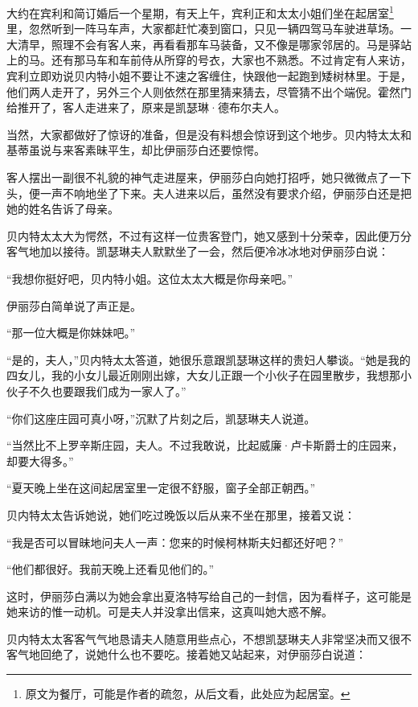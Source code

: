\par 大约在宾利和简订婚后一个星期，有天上午，宾利正和太太小姐们坐在起居室\footnote{原文为餐厅，可能是作者的疏忽，从后文看，此处应为起居室。}里，忽然听到一阵马车声，大家都赶忙凑到窗口，只见一辆四驾马车驶进草场。一大清早，照理不会有客人来，再看看那车马装备，又不像是哪家邻居的。马是驿站上的马。还有那马车和车前侍从所穿的号衣，大家也不熟悉。不过肯定有人来访，宾利立即劝说贝内特小姐不要让不速之客缠住，快跟他一起跑到矮树林里。于是，他们两人走开了，另外三个人则依然在那里猜来猜去，尽管猜不出个端倪。霍然门给推开了，客人走进来了，原来是凯瑟琳·德布尔夫人。
\par 当然，大家都做好了惊讶的准备，但是没有料想会惊讶到这个地步。贝内特太太和基蒂虽说与来客素昧平生，却比伊丽莎白还要惊愕。
\par 客人摆出一副很不礼貌的神气走进屋来，伊丽莎白向她打招呼，她只微微点了一下头，便一声不响地坐了下来。夫人进来以后，虽然没有要求介绍，伊丽莎白还是把她的姓名告诉了母亲。
\par 贝内特太太大为愕然，不过有这样一位贵客登门，她又感到十分荣幸，因此便万分客气地加以接待。凯瑟琳夫人默默坐了一会，然后便冷冰冰地对伊丽莎白说：
\par “我想你挺好吧，贝内特小姐。这位太太大概是你母亲吧。”
\par 伊丽莎白简单说了声正是。
\par “那一位大概是你妹妹吧。”
\par “是的，夫人，”贝内特太太答道，她很乐意跟凯瑟琳这样的贵妇人攀谈。“她是我的四女儿，我的小女儿最近刚刚出嫁，大女儿正跟一个小伙子在园里散步，我想那小伙子不久也要跟我们成为一家人了。”
\par “你们这座庄园可真小呀，”沉默了片刻之后，凯瑟琳夫人说道。
\par “当然比不上罗辛斯庄园，夫人。不过我敢说，比起威廉·卢卡斯爵士的庄园来，却要大得多。”
\par “夏天晚上坐在这间起居室里一定很不舒服，窗子全部正朝西。”
\par 贝内特太太告诉她说，她们吃过晚饭以后从来不坐在那里，接着又说：
\par “我是否可以冒昧地问夫人一声：您来的时候柯林斯夫妇都还好吧？”
\par “他们都很好。我前天晚上还看见他们的。”
\par 这时，伊丽莎白满以为她会拿出夏洛特写给自己的一封信，因为看样子，这可能是她来访的惟一动机。可是夫人并没拿出信来，这真叫她大惑不解。
\par 贝内特太太客客气气地恳请夫人随意用些点心，不想凯瑟琳夫人非常坚决而又很不客气地回绝了，说她什么也不要吃。接着她又站起来，对伊丽莎白说道：
